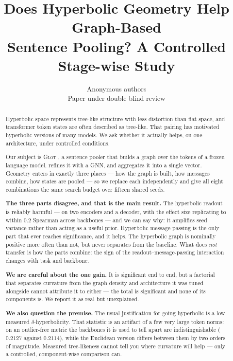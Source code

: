 \documentclass{article}
\title{Does Hyperbolic Geometry Help Graph-Based\\
Sentence Pooling? A Controlled Stage-wise Study}
\author{Anonymous authors\\
Paper under double-blind review}
\begin{document}
\maketitle

\begin{abstract}
Hyperbolic space represents tree-like structure with less distortion than flat
space, and transformer token states are often described as tree-like. That
pairing has motivated hyperbolic versions of many models. We ask whether it
actually helps, on one architecture, under controlled conditions.

Our subject is \textsc{Glot} \citep{mantri2026glot}, a sentence pooler that
builds a graph over the tokens of a frozen language model, refines it with a
GNN, and aggregates it into a single vector. Geometry enters in exactly three
places --- how the graph is built, how messages combine, how states are pooled
--- so we replace each independently and give all eight combinations the same
search budget over fifteen shared seeds.

\textbf{The three parts disagree, and that is the main result.} The hyperbolic
readout is reliably harmful --- on two encoders and a decoder, with the effect
size replicating to within $0.2$ Spearman across backbones --- and we can say
why: it amplifies seed variance rather than acting as a useful prior.
Hyperbolic message passing is the only part that ever reaches significance, and
it helps. The hyperbolic graph is nominally positive more often than not, but
never separates from the baseline. What does \emph{not} transfer is how the
parts combine: the sign of the readout--message-passing interaction changes
with task and backbone.

\textbf{We are careful about the one gain.} It is significant end to end, but a
factorial that separates curvature from the graph density and architecture it
was tuned alongside cannot attribute it to either --- the total is significant
and none of its components is. We report it as real but unexplained.

\textbf{We also question the premise.} The usual justification for going
hyperbolic is a low measured $\delta$-hyperbolicity. That statistic is an
artifact of a few very large token norms: on an outlier-free metric the
backbones it is used to tell apart are indistinguishable ($0.2127$ against
$0.2114$), while the Euclidean version differs between them by two orders of
magnitude. Measured tree-likeness cannot tell you where curvature will help ---
only a controlled, component-wise comparison can.
\end{abstract}
\end{document}
